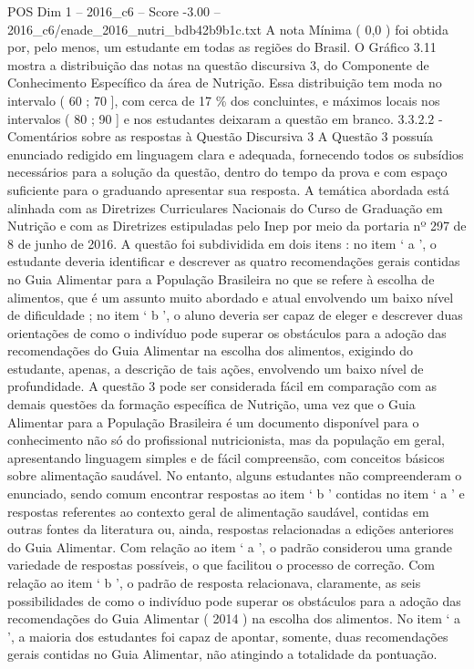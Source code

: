 \begin{textsample}{POS Dim 1 – 2016\_c6 – Score -3.00 – 2016\_c6/enade\_2016\_nutri\_bdb42b9b1c.txt}
A nota Mínima ( 0,0 ) foi obtida por, pelo menos, um estudante em todas as regiões do Brasil.
O Gráfico 3.11 mostra a distribuição das notas na questão discursiva 3, do Componente de Conhecimento Específico da área de Nutrição.
Essa distribuição tem moda no intervalo ( 60 ; 70 ], com cerca de 17 \% dos concluintes, e máximos locais nos intervalos ( 80 ; 90 ] e nos estudantes deixaram a questão em branco. 3.3.2.2 - Comentários sobre as respostas à Questão Discursiva 3 A Questão 3 possuía enunciado redigido em linguagem clara e adequada, fornecendo todos os subsídios necessários para a solução da questão, dentro do tempo da prova e com espaço suficiente para o graduando apresentar sua resposta.
A temática abordada está alinhada com as Diretrizes Curriculares Nacionais do Curso de Graduação em Nutrição e com as Diretrizes estipuladas pelo Inep por meio da portaria nº 297 de 8 de junho de 2016.
A questão foi subdividida em dois itens : no item ‘ a ’, o estudante deveria identificar e descrever as quatro recomendações gerais contidas no Guia Alimentar para a População Brasileira no que se refere à escolha de alimentos, que é um assunto muito abordado e atual envolvendo um baixo nível de dificuldade ; no item ‘ b ’, o aluno deveria ser capaz de eleger e descrever duas orientações de como o indivíduo pode superar os obstáculos para a adoção das recomendações do Guia Alimentar na escolha dos alimentos, exigindo do estudante, apenas, a descrição de tais ações, envolvendo um baixo nível de profundidade.
A questão 3 pode ser considerada fácil em comparação com as demais questões da formação específica de Nutrição, uma vez que o Guia Alimentar para a População Brasileira é um documento disponível para o conhecimento não só do profissional nutricionista, mas da população em geral, apresentando linguagem simples e de fácil compreensão, com conceitos básicos sobre alimentação saudável.
No entanto, alguns estudantes não compreenderam o enunciado, sendo comum encontrar respostas ao item ‘ b ’ contidas no item ‘ a ’ e respostas referentes ao contexto geral de alimentação saudável, contidas em outras fontes da literatura ou, ainda, respostas relacionadas a edições anteriores do Guia Alimentar.
Com relação ao item ‘ a ’, o padrão considerou uma grande variedade de respostas possíveis, o que facilitou o processo de correção.
Com relação ao item ‘ b ’, o padrão de resposta relacionava, claramente, as seis possibilidades de como o indivíduo pode superar os obstáculos para a adoção das recomendações do Guia Alimentar ( 2014 ) na escolha dos alimentos.
No item ‘ a ’, a maioria dos estudantes foi capaz de apontar, somente, duas recomendações gerais contidas no Guia Alimentar, não atingindo a totalidade da pontuação.

\end{textsample}

